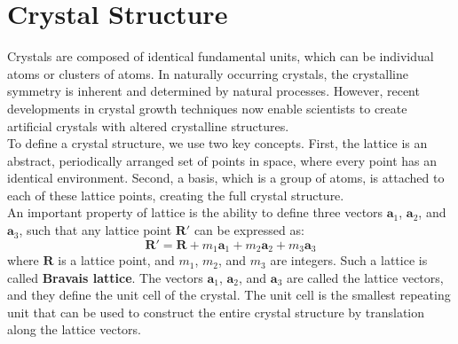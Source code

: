 \section{Crystal Structure}
Crystals are composed of identical fundamental units, which can be individual atoms or clusters of atoms. In naturally occurring crystals, the crystalline symmetry is inherent and determined by natural processes. However, recent developments in crystal growth techniques now enable scientists to create artificial crystals with altered crystalline structures.\\
To define a crystal structure, we use two key concepts. First, the lattice is an abstract, periodically arranged set of points in space, where every point has an identical environment. Second, a basis, which is a group of atoms, is attached to each of these lattice points, creating the full crystal structure.\\
An important property of lattice is the ability to define three vectors $\mathbf{a}_1$, $\mathbf{a}_2$, and $\mathbf{a}_3$, such that any lattice point $\mathbf{R'}$ can be expressed as:
\begin{equation*}
	\mathbf{R'} = \mathbf{R} + m_1 \mathbf{a}_1 + m_2 \mathbf{a}_2 + m_3 \mathbf{a}_3
\end{equation*}
where $\mathbf{R}$ is a lattice point, and $m_1$, $m_2$, and $m_3$ are integers. Such a lattice is called \textbf{Bravais lattice}. The vectors $\mathbf{a}_1$, $\mathbf{a}_2$, and $\mathbf{a}_3$ are called the lattice vectors, and they define the unit cell of the crystal. The unit cell is the smallest repeating unit that can be used to construct the entire crystal structure by translation along the lattice vectors.\\
\begin{center}
	\begin{minipage}{0.5\textwidth}
		\centering
	\end{minipage}
\end{center}


